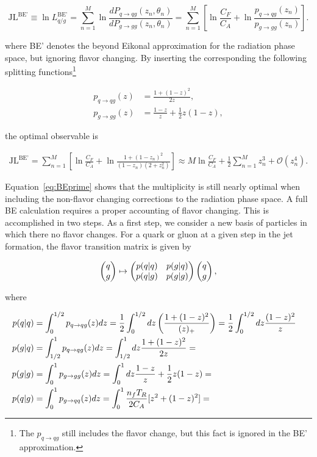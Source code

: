 \documentclass[letterpaper,11pt]{article}
\begin{document}
\begin{equation}
\label{eq:MLLLL}
\text{JL}^\text{BE'} \equiv \ln L_{q/g}^\text{BE'} = \sum_{n=1}^M \ln \frac{dP_{q\to qg}(z_n,\theta_n)}{dP_{g\to gg}(z_n,\theta_n)} = \sum_{n=1}^M\left[\ln \frac{C_F}{C_A} + \ln \frac{p_{q\to qg}(z_n)}{p_{g\to gg}(z_n)} \right].
\end{equation}

\noindent where BE' denotes the beyond Eikonal approximation for the radiation phase space, but ignoring flavor changing.  By inserting the corresponding the following splitting functions\footnote{The $p_{q\to qg}$ still includes the flavor change, but this fact is ignored in the BE' approximation.}

\begin{align}
p_{q\to qg}(z) & = \frac{1 + (1 - z)^2}{2z},\\
p_{g\to gg}(z) & = \frac{1 - z}{z} + \frac12 z(1-z),
\end{align}

\noindent the optimal observable is

\begin{align}
\label{eq:BEprime}
\text{JL}^\text{BE'} = \sum_{n=1}^M\left[\ln \frac{C_F}{C_A} + \ln \frac{1+(1-z_n)^2}{(1-z_n)(2 + z_n^2)} \right]\approx M\ln \frac{C_F}{C_A}+\frac{1}{2}\sum_{n=1}^M z_n^3+\mathcal{O}(z_n^4).
\end{align}

Equation~\ref{eq:BEprime} shows that the multiplicity is still nearly optimal when including the non-flavor changing corrections to the radiation phase space.  A full BE calculation requires a proper accounting of flavor changing.  This is accomplished in two steps.  As a first step, we consider a new basis of particles in which there no flavor changes.  For a quark or gluon at a given step in the jet formation, the flavor transition matrix is given by

\begin{align}
\begin{pmatrix}q \cr g\end{pmatrix}\mapsto \begin{pmatrix}p(q|q) & p(g|q) \cr p(q|g) & p(g|g)\end{pmatrix}\begin{pmatrix}q \cr g\end{pmatrix},
\end{align}

\noindent where

\begin{align}
p(q|q)&=\int_0^{1/2} p_{q\to qg}(z) dz=\frac{1}{2}\int_0^{1/2} dz\left(\frac{1 + (1 - z)^2}{(z)_+}\right)=\frac{1}{2}\int_0^{1/2}dz\frac{(1 - z)^2}{z}\cr
p(g|q)&=\int_{1/2}^{1} p_{q\to qg}(z) dz=\int_{1/2}^1 dz \frac{1 + (1 - z)^2}{2z}= \cr
p(g|g)&=\int_{0}^{1} p_{g\to gg}(z) dz=\int_0^1 dz \frac{1 - z}{z} + \frac12 z(1-z)= \cr
p(q|g)&=\int_{0}^{1} p_{g\to qq}(z) dz=\int_0^1 \frac{n_f T_R}{2C_A}[z^2 + (1-z)^2] = 
\end{align}
\end{document}
